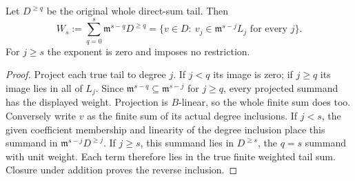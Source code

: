 \begin{lemma}
\label{hir:relative-normal-actual-weighted-tail-coordinate-dictionary}
\leanok
Let $D^{\geq q}$ be the original whole direct-sum tail. Then
\[
 W_s:=\sum_{q=0}^s\mathfrak m^{s-q}D^{\geq q}
 =\{v\in D:\ v_j\in\mathfrak m^{s-j}L_j\text{ for every }j\}.
\]
For $j\geq s$ the exponent is zero and imposes no restriction.
\end{lemma}
\begin{proof}
Project each true tail to degree $j$. If $j<q$ its image is zero;
if $j\geq q$ its image lies in all of $L_j$. Since
$\mathfrak m^{s-q}\subseteq\mathfrak m^{s-j}$ for $j\geq q$,
every projected summand has the displayed weight. Projection is
$B$-linear, so the whole finite sum does too.
Conversely write $v$ as the finite sum of its actual degree inclusions.
If $j<s$, the given coefficient membership and linearity of the degree
inclusion place this summand in $\mathfrak m^{s-j}D^{\geq j}$.
If $j\geq s$, this summand lies in $D^{\geq s}$, the $q=s$
summand with unit weight. Each term therefore lies in the true finite
weighted tail sum. Closure under addition proves the reverse inclusion.
\end{proof}


